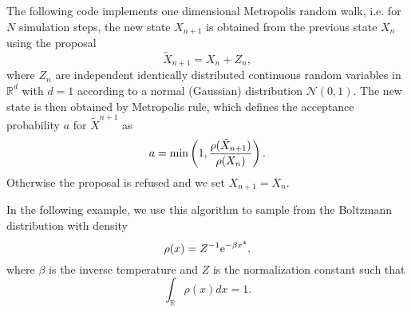 \documentclass{scrartcl}
\newcommand{\R}{\mathbb{R}}
\begin{document}
The following code implements one dimensional Metropolis random walk, i.e. for $N$ simulation steps, the new state $X_{n+1}$ is obtained from the previous state $X_{n}$ using the proposal
\[
\tilde{X}_{n+1} = X_n + Z_n,
\]
where $Z_n$ are independent identically distributed continuous random variables in $\R^d$ with $d=1$ according to a normal (Gaussian) distribution $\mathcal{N}(0,1)$. The new state is then obtained by Metropolis rule, which defines the acceptance probability $a$ for $\tilde{X}^{n+1}$ as
\[
a  = {\rm min}\left(1, \frac{\rho(\tilde{X}_{n+1})}{\rho(X_n)}\right).
\]
Otherwise the proposal is refused and we set $X_{n+1}=X_{n}$. 

In the following example, we use this algorithm to sample from the Boltzmann distribution with density
\begin{equation}
\rho(x) = Z^{-1}{\rm e}^{-\beta x^4},
\label{quartic}
\end{equation}
where $\beta$ is the inverse temperature and $Z$ is the normalization constant such that
\[
\int_{\R} \rho(x)dx = 1.
\]
\end{document}
